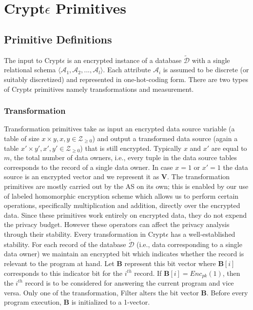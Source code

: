 \section{Crypt$\epsilon$ Primitives}
\subsection{Primitive Definitions} 
The input to Crypt$\epsilon$ is an encrypted instance of a database $\boldsymbol{\tilde{\mathcal{D}}}$ with a single relational schema $\langle \mathcal{A}_1,\mathcal{A}_2, . . . ,\mathcal{A}_l\rangle$. Each attribute $\mathcal{A}_i$ is assumed to be discrete
(or suitably discretized) and represented in one-hot-coding form. 
There are two types of Crypt$\epsilon$ primitives namely transformations and measurement.
\subsubsection{\textbf{Transformation}}
 Transformation primitives take
as input an encrypted data source variable (a table of size $x \times y, x,y \in \mathcal{Z}_{\geq 0}$) and output
a transformed data source (again  a table $x' \times y', x',y' \in \mathcal{Z}_{\geq 0}$) that is still encrypted. Typically $x$ and $x'$ are equal to $m$, the total number of data owners, i.e., every tuple in the data source tables corresponds to the record of a single data owner. In case $x=1$ or $x'=1$ the data source is an encrypted vector and we represent it as $\mathbf{V}$.
The transformation primitives are mostly carried out by the \textsf{AS} on its own; this is enabled by our use of labeled homomorphic encryption scheme which allows us to perform certain operations, specifically multiplication and addition, directly over the encrypted data. %
Since these primitives work entirely on encrypted data, they do not expend the privacy budget. However these operators can affect the privacy analysis through their stability. Every transformation in Crypt$\epsilon$ has a well-established stability.
For each record of the database $\boldsymbol{\tilde{\mathcal{D}}}$ (i.e., data corresponding to a single data owner) we maintain an encrypted bit which indicates whether the record is relevant to the program at hand. Let $\mathbf{B}$ represent this bit vector where $\mathbf{B}[i]$ corresponds to this indicator bit for the $i^{th}$ record.  If $\mathbf{B}[i] =Enc_{pk}(1)$, then the $i^{th}$ record is to be considered for answering the current program and vice versa. Only one of the transformation, \textsf{Filter} alters the bit vector $\mathbf{B}$. Before every program execution, $\mathbf{B}$ is initialized to a 1-vector. 
